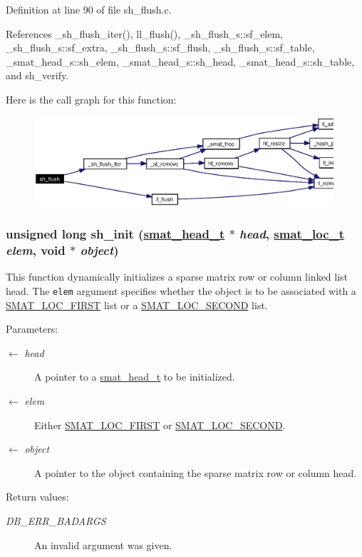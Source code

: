 Definition at line 90 of file sh\_\-flush.c.

References \_\-sh\_\-flush\_\-iter(), ll\_\-flush(), \_\-sh\_\-flush\_\-s::sf\_\-elem, \_\-sh\_\-flush\_\-s::sf\_\-extra, \_\-sh\_\-flush\_\-s::sf\_\-flush, \_\-sh\_\-flush\_\-s::sf\_\-table, \_\-smat\_\-head\_\-s::sh\_\-elem, \_\-smat\_\-head\_\-s::sh\_\-head, \_\-smat\_\-head\_\-s::sh\_\-table, and sh\_\-verify.

Here is the call graph for this function:\begin{figure}[H]
\begin{center}
\leavevmode
\includegraphics[width=315pt]{group__dbprim__smat_ga22_cgraph}
\end{center}
\end{figure}
\hypertarget{group__dbprim__smat_ga18}{
\subsubsection[sh\_\-init]{\setlength{\rightskip}{0pt plus 5cm}unsigned long sh\_\-init (\hyperlink{struct__smat__head__s}{smat\_\-head\_\-t} $\ast$ {\em head}, \hyperlink{group__dbprim__smat_ga6}{smat\_\-loc\_\-t} {\em elem}, void $\ast$ {\em object})}}
\label{group__dbprim__smat_ga18}


This function dynamically initializes a sparse matrix row or column linked list head. The {\tt elem} argument specifies whether the object is to be associated with a \hyperlink{group__dbprim__smat_gga70a137}{SMAT\_\-LOC\_\-FIRST} list or a \hyperlink{group__dbprim__smat_gga70a138}{SMAT\_\-LOC\_\-SECOND} list.

\begin{Desc}
\item[Parameters:]
\begin{description}
\item[\mbox{$\leftarrow$} {\em head}]A pointer to a \hyperlink{group__dbprim__smat_ga1}{smat\_\-head\_\-t} to be initialized. \item[\mbox{$\leftarrow$} {\em elem}]Either \hyperlink{group__dbprim__smat_gga70a137}{SMAT\_\-LOC\_\-FIRST} or \hyperlink{group__dbprim__smat_gga70a138}{SMAT\_\-LOC\_\-SECOND}. \item[\mbox{$\leftarrow$} {\em object}]A pointer to the object containing the sparse matrix row or column head.\end{description}
\end{Desc}
\begin{Desc}
\item[Return values:]
\begin{description}
\item[{\em DB\_\-ERR\_\-BADARGS}]An invalid argument was given.\end{description}
\end{Desc}


